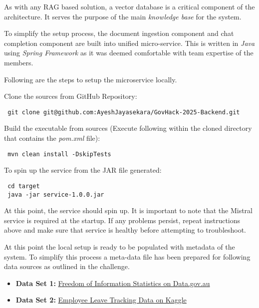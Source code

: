 As with any RAG based solution, a vector database is a critical component of the architecture.
It serves the purpose of the main \emph{knowledge base} for the system.

To simplify the setup process, the document ingestion component and chat completion component are built into unified micro-service.
This is written in \emph{Java} using \emph{Spring Framework} as it was deemed comfortable with team expertise of the members.

Following are the steps to setup the microservice locally.


Clone the sources from GitHub Repository:
\begin{lstlisting}
 git clone git@github.com:AyeshJayasekara/GovHack-2025-Backend.git
\end{lstlisting}

Build the executable from sources (Execute following within the cloned directory that contains the \emph{pom.xml} file):
\begin{lstlisting}
 mvn clean install -DskipTests
\end{lstlisting}

To spin up the service from the JAR file generated:
\begin{lstlisting}
 cd target
 java -jar service-1.0.0.jar
\end{lstlisting}

At this point, the service should spin up. It is important to note that the Mistral service is required at the startup.
If any problems persist, repeat instructions above and make sure that service is healthy before attempting to troubleshoot.



At this point the local setup is ready to be populated with metadata of the system.
To simplify this process a meta-data file has been prepared for following data sources as outlined in the challenge.

\begin{itemize}
    \item \textbf{Data Set 1:} \href{https://www.data.gov.au/data/dataset/freedom-of-information-statistics}{Freedom of Information Statistics on Data.gov.au}
    \item \textbf{Data Set 2:} \href{https://www.kaggle.com/datasets/manishkumar21324/employee-leave-tracking-data}{Employee Leave Tracking Data on Kaggle}
\end{itemize}

